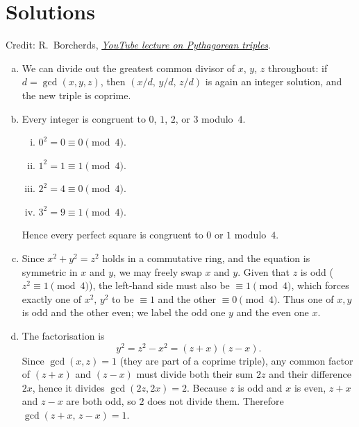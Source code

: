 \documentclass[12pt]{article}
\begin{document}
\newpage
\section*{Solutions}

Credit: R.\ Borcherds,
\href{https://www.youtube.com/watch?v=JZKDmTIFR7A&list}{\textit{YouTube
lecture on Pythagorean triples}}.

\begin{enumerate}[(a)]

  \item We can divide out the greatest common divisor of $x$, $y$, $z$
        throughout: if $d = \gcd(x,y,z)$, then $(x/d,\, y/d,\, z/d)$ is
        again an integer solution, and the new triple is coprime.

  \item Every integer is congruent to $0$, $1$, $2$, or $3$ modulo~$4$.
        \begin{enumerate}[(i)]
          \item $0^2 = 0 \equiv 0 \pmod{4}$.
          \item $1^2 = 1 \equiv 1 \pmod{4}$.
          \item $2^2 = 4 \equiv 0 \pmod{4}$.
          \item $3^2 = 9 \equiv 1 \pmod{4}$.
        \end{enumerate}
        Hence every perfect square is congruent to $0$ or $1$ modulo~$4$.

  \item Since $x^2 + y^2 = z^2$ holds in a commutative ring, and the
        equation is symmetric in $x$ and $y$, we may freely swap $x$ and
        $y$.  Given that $z$ is odd ($z^2 \equiv 1 \pmod 4$), the
        left-hand side must also be $\equiv 1 \pmod 4$, which forces exactly
        one of $x^2,\, y^2$ to be $\equiv 1$ and the other $\equiv 0
        \pmod 4$.  Thus one of $x,y$ is odd and the other even; we label the
        odd one $y$ and the even one $x$.

  \item The factorisation is
        \[
          y^2 = z^2 - x^2 = (z + x)(z - x).
        \]
        Since $\gcd(x,z)=1$ (they are part of a coprime triple), any common
        factor of $(z+x)$ and $(z-x)$ must divide both their sum $2z$ and
        their difference $2x$, hence it divides $\gcd(2z,2x)=2$.  Because
        $z$ is odd and $x$ is even, $z+x$ and $z-x$ are both odd, so $2$
        does not divide them.  Therefore $\gcd(z+x,\, z-x)=1$.


\end{enumerate}
\end{document}
